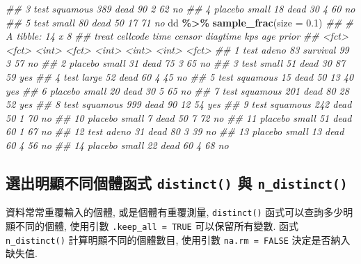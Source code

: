 \documentclass[
]{book}
\newenvironment{Shaded}{\begin{snugshade}}{\end{snugshade}}
\newcommand{\CommentTok}[1]{\textcolor[rgb]{0.56,0.35,0.01}{\textit{#1}}}
\newcommand{\DataTypeTok}[1]{\textcolor[rgb]{0.13,0.29,0.53}{#1}}
\newcommand{\FloatTok}[1]{\textcolor[rgb]{0.00,0.00,0.81}{#1}}
\newcommand{\KeywordTok}[1]{\textcolor[rgb]{0.13,0.29,0.53}{\textbf{#1}}}
\newcommand{\NormalTok}[1]{#1}
\newcommand{\OperatorTok}[1]{\textcolor[rgb]{0.81,0.36,0.00}{\textbf{#1}}}
\newcommand{\StringTok}[1]{\textcolor[rgb]{0.31,0.60,0.02}{#1}}
\begin{document}
\begin{Shaded}
\begin{Highlighting}[]
\CommentTok{\#\# 3 test    squamous   389 dead           90     2    62 no   }
\CommentTok{\#\# 4 placebo small       18 dead           30     4    60 no   }
\CommentTok{\#\# 5 test    small       80 dead           50    17    71 no}
\NormalTok{dd }\OperatorTok{\%\textgreater{}\%}\StringTok{ }\KeywordTok{sample\_frac}\NormalTok{(}\DataTypeTok{size =} \FloatTok{0.1}\NormalTok{)}
\CommentTok{\#\# \# A tibble: 14 x 8}
\CommentTok{\#\#    treat   cellcode  time censor   diagtime   kps   age prior}
\CommentTok{\#\#    \textless{}fct\textgreater{}   \textless{}fct\textgreater{}    \textless{}int\textgreater{} \textless{}fct\textgreater{}       \textless{}int\textgreater{} \textless{}int\textgreater{} \textless{}int\textgreater{} \textless{}fct\textgreater{}}
\CommentTok{\#\#  1 test    adeno       83 survival       99     3    57 no   }
\CommentTok{\#\#  2 placebo small       31 dead           75     3    65 no   }
\CommentTok{\#\#  3 test    small       51 dead           30    87    59 yes  }
\CommentTok{\#\#  4 test    large       52 dead           60     4    45 no   }
\CommentTok{\#\#  5 test    squamous    15 dead           50    13    40 yes  }
\CommentTok{\#\#  6 placebo small       20 dead           30     5    65 no   }
\CommentTok{\#\#  7 test    squamous   201 dead           80    28    52 yes  }
\CommentTok{\#\#  8 test    squamous   999 dead           90    12    54 yes  }
\CommentTok{\#\#  9 test    squamous   242 dead           50     1    70 no   }
\CommentTok{\#\# 10 placebo small        7 dead           50     7    72 no   }
\CommentTok{\#\# 11 placebo small       51 dead           60     1    67 no   }
\CommentTok{\#\# 12 test    adeno       31 dead           80     3    39 no   }
\CommentTok{\#\# 13 placebo small       13 dead           60     4    56 no   }
\CommentTok{\#\# 14 placebo small       22 dead           60     4    68 no}
\end{Highlighting}
\end{Shaded}

\hypertarget{ux9078ux51faux660eux986fux4e0dux540cux500bux9ad4ux51fdux5f0f-distinct-ux8207-n_distinct}{%
\subsection{\texorpdfstring{選出明顯不同個體函式 \texttt{distinct()} 與 \texttt{n\_distinct()}}{選出明顯不同個體函式 distinct() 與 n\_distinct()}}\label{ux9078ux51faux660eux986fux4e0dux540cux500bux9ad4ux51fdux5f0f-distinct-ux8207-n_distinct}}

資料常常重覆輸入的個體, 或是個體有重覆測量,
\texttt{distinct()} 函式可以查詢多少明顯不同的個體,
使用引數 \texttt{.keep\_all\ =\ TRUE} 可以保留所有變數.
函式 \texttt{n\_distinct()} 計算明顯不同的個體數目,
使用引數 \texttt{na.rm\ =\ FALSE} 決定是否納入缺失值.
\end{document}
